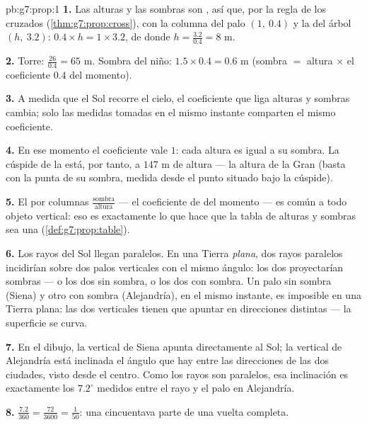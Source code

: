 \begin{solution}{pb:g7:prop:1}
\textbf{1.} Las alturas y las sombras son , así que, por la
regla de los  cruzados (\cref{thm:g7:prop:cross}), con la columna del palo
$(1,\ 0.4)$ y la del árbol $(h,\ 3.2)$:
$0.4 \times h = 1 \times 3.2$, de donde
$h = \frac{3.2}{0.4} = 8$ m.

\textbf{2.} Torre: $\frac{26}{0.4} = 65$ m. Sombra del niño:
$1.5 \times 0.4 = 0.6$ m (sombra $=$ altura $\times$ el
coeficiente $0.4$ del momento).

\textbf{3.} A medida que el Sol recorre el cielo, el coeficiente
que liga alturas y sombras cambia; solo las medidas tomadas en
el mismo instante comparten el mismo coeficiente.

\textbf{4.} En ese momento el coeficiente vale $1$: cada altura
es igual a su sombra. La cúspide de la  está, por tanto, a
$147$ m de altura --- la altura de la Gran  (basta con la punta
de su sombra, medida desde el punto situado bajo la cúspide).

\textbf{5.} El  por columnas
$\frac{\text{sombra}}{\text{altura}}$ --- el coeficiente de
 del momento --- es común a todo objeto
vertical: eso es exactamente lo que hace que la tabla de alturas y
sombras sea una  (\cref{def:g7:prop:table}).

\textbf{6.} Los rayos del Sol llegan paralelos. En una Tierra \emph{plana},
dos rayos paralelos incidirían sobre dos palos verticales con el mismo
ángulo: los dos proyectarían sombras  --- o los dos sin
sombra, o los dos con sombra. Un palo sin sombra (Siena) y
otro con sombra (Alejandría), en el mismo instante, es
imposible en una Tierra plana: las dos verticales tienen que apuntar en
direcciones distintas --- la superficie se curva.

\textbf{7.} En el dibujo, la vertical de Siena apunta directamente
al Sol; la vertical de Alejandría está inclinada el ángulo
que hay entre las direcciones de las dos ciudades, visto desde el centro. Como los
rayos son paralelos, esa inclinación es exactamente los $7.2^\circ$ medidos
entre el rayo y el palo en Alejandría.

\textbf{8.} $\frac{7.2}{360} = \frac{72}{3600} = \frac{1}{50}$:
una cincuentava parte de una vuelta completa.


\end{solution}
